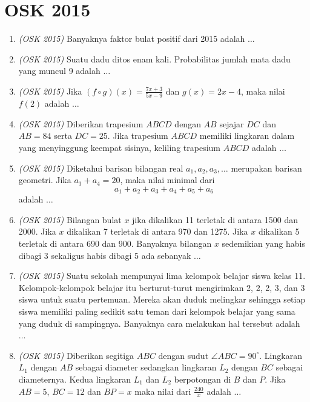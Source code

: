 \section{OSK 2015}
\begin{enumerate}
	
	\item \textit{(OSK 2015)} Banyaknya faktor bulat positif dari 2015 adalah $\dots$
	
	\item \textit{(OSK 2015)} Suatu dadu ditos enam kali. Probabilitas jumlah mata dadu yang muncul 9 adalah $\dots$
	
	\item \textit{(OSK 2015)} Jika $(f \circ g)(x) = \frac{7x + 3}{5x - 9}$ dan $g(x) = 2x - 4$, maka nilai $f(2)$ adalah $\dots$
	
	\item \textit{(OSK 2015)} Diberikan trapesium $ABCD$ dengan $AB$ sejajar $DC$ dan $AB = 84$ serta $DC = 25$. Jika trapesium $ABCD$ memiliki lingkaran dalam yang menyinggung keempat sisinya, keliling trapesium $ABCD$ adalah $\dots$
	
	\item \textit{(OSK 2015)} Diketahui barisan bilangan real $a_1, a_2, a_3, \ldots$ merupakan barisan geometri. Jika $a_1 + a_4 = 20$, maka nilai minimal dari
	\[
	a_1 + a_2 + a_3 + a_4 + a_5 + a_6
	\]
	adalah $\dots$
	
	\item \textit{(OSK 2015)} Bilangan bulat $x$ jika dikalikan 11 terletak di antara 1500 dan 2000. Jika $x$ dikalikan 7 terletak di antara 970 dan 1275. Jika $x$ dikalikan 5 terletak di antara 690 dan 900. Banyaknya bilangan $x$ sedemikian yang habis dibagi 3 sekaligus habis dibagi 5 ada sebanyak $\dots$
	
	\item \textit{(OSK 2015)} Suatu sekolah mempunyai lima kelompok belajar siswa kelas 11. Kelompok-kelompok belajar itu berturut-turut mengirimkan 2, 2, 2, 3, dan 3 siswa untuk suatu pertemuan. Mereka akan duduk melingkar sehingga setiap siswa memiliki paling sedikit satu teman dari kelompok belajar yang sama yang duduk di sampingnya. Banyaknya cara melakukan hal tersebut adalah $\dots$
	
	\item \textit{(OSK 2015)} Diberikan segitiga $ABC$ dengan sudut $\angle ABC = 90^\circ$. Lingkaran $L_1$ dengan $AB$ sebagai diameter sedangkan lingkaran $L_2$ dengan $BC$ sebagai diameternya. Kedua lingkaran $L_1$ dan $L_2$ berpotongan di $B$ dan $P$. Jika $AB = 5$, $BC = 12$ dan $BP = x$ maka nilai dari $\frac{240}{x}$ adalah $\dots$
	

\end{enumerate}
